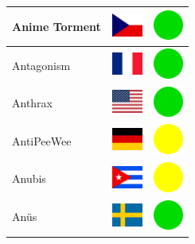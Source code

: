 \documentclass[12pt, a4paper, twoside]{report}
\begin{document}
\begin{center}
\begin{longtable}{|p{5cm}|p{2cm}|p{2cm}|}
 Anime Torment                                              & \includegraphics[width=1cm]{4x3/cz} &   \includegraphics[width=1cm]{likes/y} \\ \hline
 Antagonism                                                 & \includegraphics[width=1cm]{4x3/fr} &   \includegraphics[width=1cm]{likes/y} \\ \hline
 Anthrax                                                    & \includegraphics[width=1cm]{4x3/us} &   \includegraphics[width=1cm]{likes/y} \\ \hline
 AntiPeeWee                                                 & \includegraphics[width=1cm]{4x3/de} &   \includegraphics[width=1cm]{likes/m} \\ \hline
 Anubis                                                     & \includegraphics[width=1cm]{4x3/cu} &   \includegraphics[width=1cm]{likes/m} \\ \hline
 Anüs                                                       & \includegraphics[width=1cm]{4x3/se} &   \includegraphics[width=1cm]{likes/y} \\ \hline

\end{longtable}
\end{center}
\end{document}
